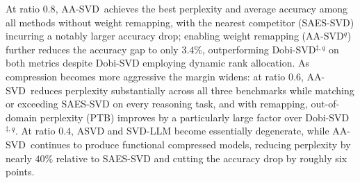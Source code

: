 \documentclass[10pt]{article} %
\theoremstyle{definition}
\theoremstyle{remark}
\newcommand{\ourmethodlight}{{\textsc{AA-SVD}}}
\begin{document}
At ratio $0.8$, \ourmethodlight~achieves the best perplexity and average accuracy among all methods without weight remapping, with the nearest competitor (SAES-SVD) incurring a notably larger accuracy drop; enabling weight remapping (\ourmethodlight$^q$) further reduces the accuracy gap to only $3.4\%$, outperforming Dobi-SVD$^{\ddagger,q}$ on both metrics despite Dobi-SVD employing dynamic rank allocation.
As compression becomes more aggressive the margin widens: at ratio $0.6$, \ourmethodlight~reduces perplexity substantially across all three benchmarks while matching or exceeding SAES-SVD on every reasoning task, and with remapping, out-of-domain perplexity (PTB) improves by a particularly large factor over Dobi-SVD$^{\ddagger,q}$.
At ratio $0.4$, ASVD and SVD-LLM become essentially degenerate, while \ourmethodlight~continues to produce functional compressed models, reducing perplexity by nearly $40\%$ relative to SAES-SVD and cutting the accuracy drop by roughly six points.
\end{document}
